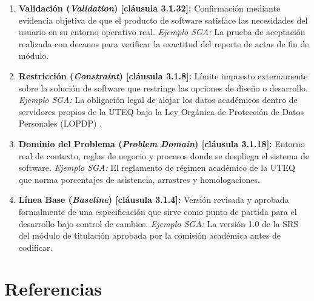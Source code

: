 \documentclass[conference]{IEEEtran}
\begin{document}
\begin{enumerate}
		\item \textbf{Validación (\emph{Validation}) [cláusula 3.1.32]:} Confirmación mediante evidencia objetiva de que el producto de software satisface las necesidades del usuario en su entorno operativo real.  
		\emph{Ejemplo SGA:} La prueba de aceptación realizada con decanos para verificar la exactitud del reporte de actas de fin de módulo.
		
		\item \textbf{Restricción (\emph{Constraint}) [cláusula 3.1.8]:} Límite impuesto externamente sobre la solución de software que restringe las opciones de diseño o desarrollo.  
		\emph{Ejemplo SGA:} La obligación legal de alojar los datos académicos dentro de servidores propios de la UTEQ bajo la Ley Orgánica de Protección de Datos Personales (LOPDP) \cite{lopdp2021}.
		
		\item \textbf{Dominio del Problema (\emph{Problem Domain}) [cláusula 3.1.18]:} Entorno real de contexto, reglas de negocio y procesos donde se despliega el sistema de software.  
		\emph{Ejemplo SGA:} El reglamento de régimen académico de la UTEQ que norma porcentajes de asistencia, arrastres y homologaciones.
		
		\item \textbf{Línea Base (\emph{Baseline}) [cláusula 3.1.4]:} Versión revisada y aprobada formalmente de una especificación que sirve como punto de partida para el desarrollo bajo control de cambios.  
		\emph{Ejemplo SGA:} La versión 1.0 de la SRS del módulo de titulación aprobada por la comisión académica antes de codificar.
	\end{enumerate}
	
	\section{Referencias}
	\printbibliography[heading=none]
	
\end{document}
